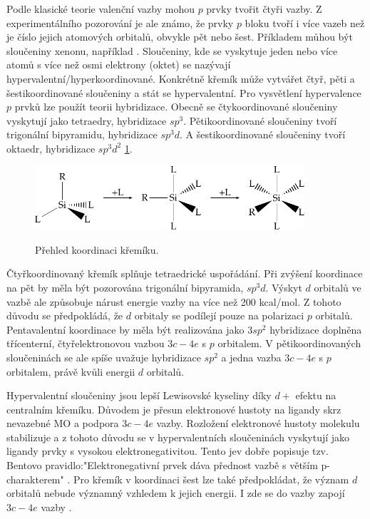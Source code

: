 \documentclass[
digital, %
table,   %
lof,     %
lot,     %
oneside,
]{fithesis3}
\begin{document}
Podle klasické teorie valenční vazby mohou $p$ prvky tvořit čtyři vazby. Z experimentálního pozorování je ale známo, že prvky $p$ bloku tvoří i více vazeb než je číslo jejich atomových orbitalů, obvykle pět nebo šest. Příkladem můhou být sloučeniny xenonu, například .
Sloučeniny, kde se vyskytuje jeden nebo více atomů s více než osmi elektrony (oktet) se nazývají hypervalentní/hyperkoordinované. Konkrétně křemík může vytvářet čtyř, pěti a šestikoordinované sloučeniny a stát se hypervalentní. Pro vysvětlení hypervalence $p$ prvků lze použít teorii hybridizace. Obecně se čtykoordinované sloučeniny vyskytují jako tetraedry, hybridizace $sp^3$. Pětikoordinované sloučeniny tvoří trigonální bipyramidu, hybridizace $sp^3d$. A šestikoordinované sloučeniny tvoří oktaedr, hybridizace $sp^3d^2$ \ref{prehled_koordinaci}.

\begin{figure}
\caption{Přehled koordinaci křemíku.}
\center \includegraphics[width=10cm]{drawing.pdf} \label{prehled_koordinaci} \end{figure}

Čtyřkoordinovaný křemík splňuje tetraedrické uspořádání. Při zvýšení koordinace na pět by měla být pozorována trigonální bipyramida, $sp^3d$. Výskyt $d$ orbitalů ve vazbě ale způsobuje nárust energie vazby na více než 200 kcal/mol. Z tohoto důvodu se předpokládá, že $d$ orbitaly se podílejí pouze na polarizaci $p$ orbitalů. Pentavalentní koordinace by měla být realizována jako $3sp^2$ hybridizace doplněna třícenterní, čtyřelektronovou vazbou $3c-4e$ s $p$ orbitalem. V pětikoordinovaných sloučeninách se ale spíše uvažuje hybridizace $sp^2$ a jedna vazba $3c-4e$ s $p$ orbitalem, právě kvůli energii $d$ orbitalů.

Hypervalentní sloučeniny jsou lepší Lewisovské kyseliny díky $d+$ efektu na centralním křemíku. Důvodem je přesun elektronové hustoty na ligandy skrz nevazebné MO a podpora $3c-4e$ vazby. Rozložení elektronové hustoty molekulu stabilizuje a z tohoto důvodu se v hypervalentních sloučeninách vyskytují jako ligandy prvky s vysokou elektronegativitou. Tento jev dobře popisuje tzv. Bentovo pravidlo:"Elektronegativní prvek dáva přednost  vazbě s větším p-charakterem" \cite{hypervalentsiliconmacmillangroup2005}. Pro křemík v koordinaci šest lze také předpokládat, že význam $d$ orbitalů nebude významný vzhledem k jejich energii. I zde se do vazby zapojí $3c-4e$ vazby \cite{Wagler2014}.
\end{document}
